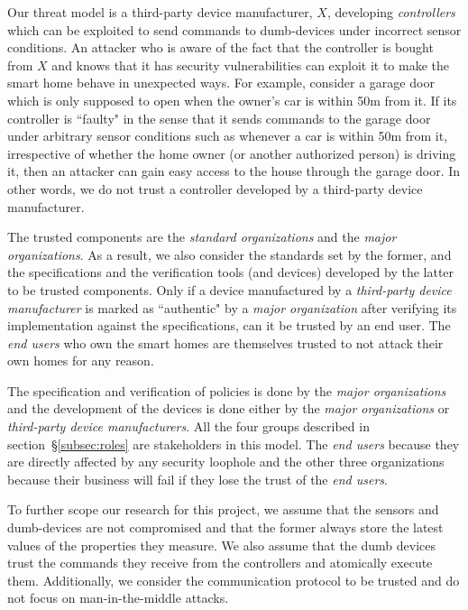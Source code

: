 \documentclass{article}
\begin{document}
Our threat model is a third-party device manufacturer, $X$, developing \textit{controllers} which can be exploited to send commands to dumb-devices under incorrect sensor conditions. An attacker who is aware of the fact that the controller is bought from $X$ and knows that it has security vulnerabilities can exploit it to make the smart home behave in unexpected ways. For example, consider a garage door which is only supposed to open when the owner's car is within 50m from it. If its controller is ``faulty" in the sense that it sends commands to the garage door under arbitrary sensor conditions such as whenever a car is within 50m from it, irrespective of whether the home owner (or another authorized person) is driving it, then an attacker can gain easy access to the house through the garage door. 
In other words, we do not trust a controller developed by a third-party device manufacturer. 

The trusted components are the \textit{standard organizations} and the \textit{major organizations}. As a result, we also consider the standards set by the former, and the specifications and the verification tools (and devices) developed by the latter to be trusted components.
Only if a device manufactured by a \textit{third-party device manufacturer} is marked as ``authentic" by a \textit{major organization} after verifying its implementation against the specifications, can it be trusted by an end user. 
The \textit{end users} who own the smart homes are themselves trusted to not attack their own homes for any reason. 

The specification and verification of policies is done by the \textit{major organizations} and the development of the devices is done either by the \textit{major organizations} or \textit{third-party device manufacturers}. All the four groups described in section~\S\ref{subsec:roles} are stakeholders in this model. The \textit{end users} because they are directly affected by any security loophole and the other three organizations because their business will fail if they lose the trust of the \textit{end users}.

 To further scope our research for this project, we assume that the sensors and dumb-devices are not compromised and that the former always store the latest values of the properties they measure. We also assume that the dumb devices trust the commands they receive from the controllers and atomically execute them. Additionally, we consider the communication protocol to be trusted and do not focus on man-in-the-middle attacks.
\end{document}
